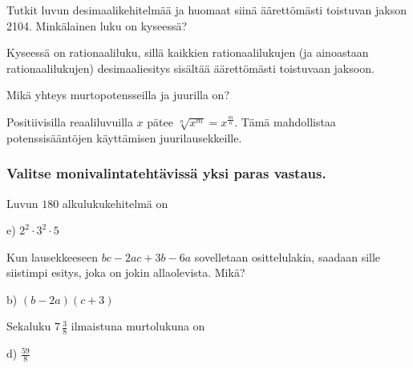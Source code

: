 \begin{tehtava}
Tutkit luvun desimaalikehitelmää ja huomaat siinä äärettömästi toistuvan jakson 2104. Minkälainen luku on kyseessä?
\begin{vastaus}
Kyseessä on rationaaliluku, sillä kaikkien rationaalilukujen (ja ainoastaan rationaalilukujen) desimaaliesitys sisältää äärettömästi toistuvaan jaksoon.
\end{vastaus}
\end{tehtava}

\begin{tehtava}
Mikä yhteys murtopotensseilla ja juurilla on?
\begin{vastaus}
Positiivisilla reaaliluvuilla $x$ pätee $\sqrt[n]{x^m} = x^{\frac{m}{n}}$. Tämä mahdollistaa potenssisääntöjen käyttämisen juurilausekkeille.
\end{vastaus}
\end{tehtava}

\subsubsection*{Valitse monivalintatehtävissä yksi paras vastaus.}

\begin{tehtava}
Luvun $180$ alkulukukehitelmä on
	\begin{vastaus}
	 e) $2^2\cdot3^2\cdot5$
	\end{vastaus}
\end{tehtava}

\begin{tehtava}
Kun lausekkeeseen $bc-2ac+3b-6a$ sovelletaan osittelulakia, saadaan sille siistimpi esitys, joka on jokin allaolevista. Mikä?
    \begin{vastaus}
	b) $(b-2a)(c+3)$
    \end{vastaus}
\end{tehtava}

\begin{tehtava}
Sekaluku $7\,\frac{3}{8}$ ilmaistuna murtolukuna on
    \begin{vastaus}
	 d) $\frac{59}{8}$
    \end{vastaus}
\end{tehtava}

